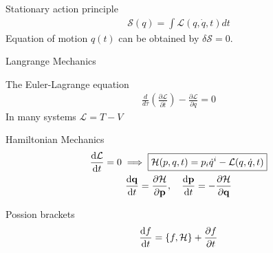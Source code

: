 \documentclass[main]{subfiles}
\begin{document}
\begin{multicols}{2}

Stationary action principle
\begin{gather}
    \mathcal{S}(q) = \int \mathcal{L}(q,\dot{q},t) dt
\end{gather}
Equation of motion $q(t)$ can be obtained by $\delta \mathcal{S} = 0$.

Langrange Mechanics

The Euler-Lagrange equation
\begin{gather}
    \boxed{
        \frac{d}{d\tau}\left(\frac{\partial \mathcal{L}}{\partial \dot t}\right) - \frac{\partial \mathcal{L}}{\partial q} = 0
    }
\end{gather}
In many systems $\mathcal{L} = T - V$

Hamiltonian Mechanics
\begin{gather}
    \dv{\mathcal{L}}{t} = 0 \implies \boxed{\mathcal{H}(p,q,t) = p_i\dot{q}^i - \mathcal{L}(q,\dot{q},t)}\\
    \dv{\vb{q}}{t} = \pdv{\mathcal{H}}{\vb{p}}, \quad \dv{\vb{p}}{t} = -\pdv{\mathcal{H}}{\vb{q}}
\end{gather}

Possion brackets
\begin{gather}
    \dv{f}{t} = \poissonbracket{f}{\mathcal{H}} + \pdv{f}{t}
\end{gather}


\end{multicols}
\end{document}
